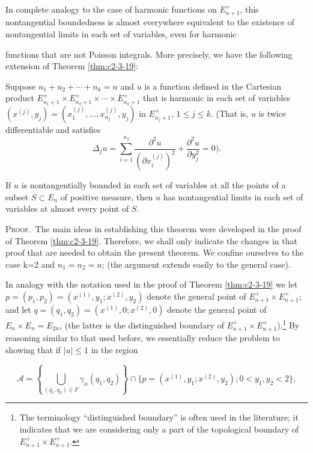In complete analogy to the case of harmonic functions on $E_{n+1}^{+}$, this nontangential boundedness is almost everywhere equivalent to the existence of nontangential limits in each set of variables, even for harmonic

functions that are not Poisson integrals. More precisely, we have the following extension of Theorem \ref{thm:c2-3-19}:

\begin{theorem}
\label{thm:c2-3-24}
Suppose $n_1 + n_2 + \cdots + n_k = n$ and $u$ is a function defined in the Cartesian product $E_{n_1+1}^+ \times E_{n_2+1}^+ \times \cdots \times E_{n_k+1}^+$ that is harmonic in each set of variables $(x^{(j)}, y_j) = (x_1^{(j)}, \ldots, x_{n_j}^{(j)}, y_j)$ in $E_{n_j+1}^+$, $1 \leq j \leq k$. (That is, $u$ is twice differentiable and satisfies
\[
\Delta_{j}u=\sum_{i=1}^{n_{j}}\frac{\partial^{2}u}{(\partial x_{i}^{(j)})^{2}}+\frac{\partial^{2}u}{\partial y_{j}^{2}}=0).
\]

\end{theorem}

If $u$ is nontangentially bounded in each set of variables at all the points of a subset $S \subset E_n$ of positive measure, then $u$ has nontangential limits in each set of variables at almost every point of $S$.

\textsc{Proof.}\ The main ideas in establishing this theorem were developed in the proof of Theorem \ref{thm:c2-3-19}. Therefore, we shall only indicate the changes in that proof that are needed to obtain the present theorem. We confine ourselves to the case k=2 and $n_{1}=n_{2}=n$; (the argument extends easily to the general case).

In analogy with the notation used in the proof of Theorem \ref{thm:c2-3-19} we let $p = (p_1, p_2) = (x^{(1)}, y_1; x^{(2)}, y_2)$ denote the general point of $E_{n+1}^{+} \times E_{n+1}^{+}$; and let $q = (q_1, q_2) = (x^{(1)}, 0; x^{(2)}, 0)$ denote the general point of $E_n \times E_n = E_{2n}$, (the latter is the distinguished boundary of $E_{n+1}^{+} \times E_{n+1}^{+}$).\footnote{The terminology ``distinguished boundary'' is often used in the literature; it indicates that we are considering only a part of the topological boundary of $E_{n+1}^{+}\times E_{n+1}^{+}$.} By reasoning similar to that used before, we essentially reduce the problem to showing that if $|u| \leq 1$ in the region

\[
\mathcal{A}=\left\{\bigcup_{(q_{1},q_{2})\in F}\gamma_{\alpha}(q_{1},q_{2})\right\}\cap\{p=(x^{(1)},y_{1};x^{(2)},y_{2});0<y_{1},y_{2}<2\},
\]

